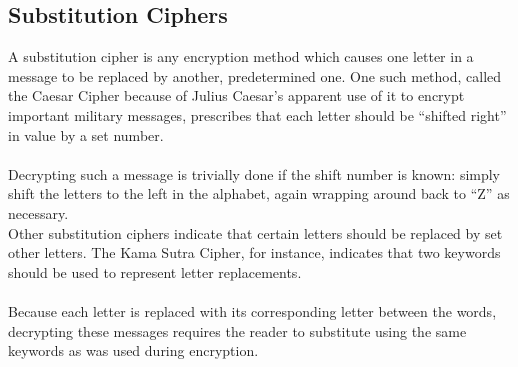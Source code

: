 			\subsection*{Substitution Ciphers}
				A substitution cipher is any encryption method which causes one letter in a message to be replaced by another, predetermined one. One such method, called the Caesar Cipher because of Julius Caesar's apparent use of it to encrypt important military messages, prescribes that each letter should be ``shifted right'' in value by a set number.\\[\baselineskip]
				\ \\[9pt]
				Decrypting such a message is trivially done if the shift number is known: simply shift the letters to the left in the alphabet, again wrapping around back to ``Z'' as necessary.\\[\baselineskip]
				Other substitution ciphers indicate that certain letters should be replaced by set other letters. The Kama Sutra Cipher, for instance, indicates that two keywords should be used to represent letter replacements.\\[\baselineskip]
				\ \\[9pt]
				Because each letter is replaced with its corresponding letter between the words, decrypting these messages requires the reader to substitute using the same keywords as was used during encryption.
